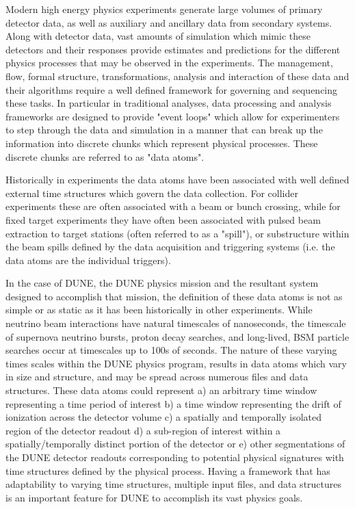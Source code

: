 \documentclass[../main-v1.tex]{subfiles}
\begin{document}
Modern high energy physics experiments generate large volumes of primary detector data, as well as auxiliary and ancillary data from secondary systems. Along with detector data, vast amounts of simulation which mimic these detectors and their responses provide estimates and predictions for the different physics processes that may be observed in the experiments.  The management, flow, formal structure, transformations, analysis and interaction of these data and their algorithms require a well defined framework for governing and sequencing these tasks.  In particular in traditional  analyses, data processing and analysis frameworks are designed to provide "event loops" which allow for experimenters to step through the data and simulation in a manner that can break up the information into discrete chunks which represent physical processes.  These discrete chunks are referred to as "data atoms".

Historically in  experiments the data atoms have been associated with well defined external time structures which govern the data collection.  For collider experiments these are often associated with a beam or bunch crossing, while for fixed target experiments they have often been associated with pulsed beam extraction to target stations (often referred to as a "spill"), or substructure within the beam spills defined by the data acquisition and triggering systems (i.e. the data atoms are the individual triggers).  

In the case of DUNE, the DUNE physics mission and the resultant system designed to accomplish that mission, the definition of these data atoms is not as simple or as static as it has been historically in other experiments.  While neutrino beam interactions have natural timescales of nanoseconds, the timescale of supernova neutrino bursts, proton decay searches, and long-lived, BSM particle searches occur at timescales up to 100s of seconds. The nature of these varying times scales within the DUNE physics program, results in data atoms which vary in size and structure, and may be spread across numerous files and data structures. These data atoms could represent a) an arbitrary time window representing a time period of interest b) a time window representing the drift of ionization across the detector volume c) a spatially and temporally isolated region of the detector readout d) a sub-region of interest within a spatially/temporally distinct portion of the detector or e) other segmentations of the DUNE detector readouts corresponding to potential physical signatures with time structures defined by the physical process. Having a framework that has adaptability to varying time structures, multiple input files, and data structures is an important feature for DUNE to accomplish its vast physics goals.
\end{document}
